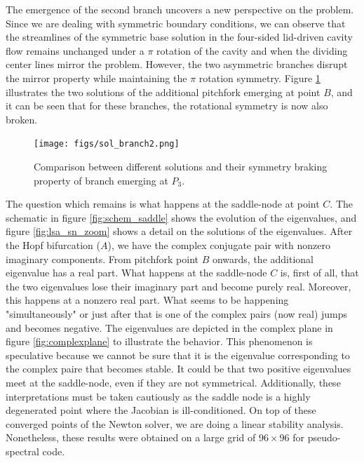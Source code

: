 The emergence of the second branch uncovers a new perspective on the problem.
Since we are dealing with symmetric boundary conditions, we can observe that
the streamlines of the symmetric base solution in the four-sided lid-driven
cavity flow remains unchanged under a $\pi$ rotation of the cavity and when the
dividing center lines mirror the problem. However, the two asymmetric branches
disrupt the mirror property while maintaining the $\pi$ rotation symmetry.
Figure \ref{fig:sol_branch2} illustrates the two solutions of the additional
pitchfork emerging at point $B$, and it can be seen that for these branches,
the rotational symmetry is now also broken.

\begin{figure}[h!]
  \centering
  \texttt{[image: figs/sol\_branch2.png]}
  \caption{Comparison between different solutions and their symmetry braking
    property of branch emerging at $P_3$.}
  \label{fig:sol_branch2}
\end{figure}

The question which remains is what happens at the saddle-node at point $C$. The
schematic in figure \ref{fig:schem_saddle} shows the evolution of the
eigenvalues, and figure \ref{fig:lsa_sn_zoom} shows a detail on the
solutions of the eigenvalues. After the Hopf bifurcation ($A$), we have the
complex conjugate pair with nonzero imaginary components. From pitchfork point
$B$ onwards, the additional eigenvalue has a real part. What happens at the
saddle-node $C$ is, first of all, that the two eigenvalues lose their imaginary
part and become purely real. Moreover, this happens at a nonzero real part.
What seems to be happening "simultaneously" or just after that is one of the
complex pairs (now real) jumps and becomes negative. The eigenvalues are
depicted in the complex plane in figure \ref{fig:complexplane} to illustrate
the behavior. This phenomenon is speculative because we cannot be sure that it
is the eigenvalue corresponding to the complex paire that becomes stable. It
could be that two positive eigenvalues meet at the saddle-node, even if they
are not symmetrical. Additionally, these interpretations must be taken
cautiously as the saddle node is a highly degenerated point where the Jacobian
is ill-conditioned. On top of these converged points of the Newton solver, we
are doing a linear stability analysis. Nonetheless, these results were obtained
on a large grid of $96 \times 96$ for pseudo-spectral code.

